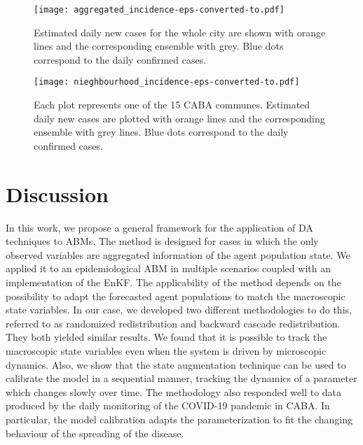 \documentclass[11pt,a4paper]{article}
\begin{document}
\begin{figure}
    \captionsetup{width=0.5\textwidth}
    \centering
    \texttt{[image: aggregated\_incidence-eps-converted-to.pdf]}
    \caption{Estimated daily new cases for the whole city are shown with orange lines and the corresponding ensemble with grey. Blue dots correspond to the daily confirmed cases.}
    \label{fig:aggregated_incidence}
\end{figure}

\begin{figure}
    \captionsetup{width=0.5\textwidth}
    \centering
    \texttt{[image: nieghbourhood\_incidence-eps-converted-to.pdf]}
    \caption{Each plot represents one of the 15 CABA communes. Estimated daily new cases are plotted with orange lines and the corresponding ensemble with grey lines. Blue dots correspond to the daily confirmed cases.}
    \label{fig:neighbourhood_incidence}
\end{figure}

\section{Discussion}

In this work, we propose a general framework for the application of DA techniques to ABMs. The method is designed for cases in which the only observed variables are aggregated information of the agent population state. We applied it to an epidemiological ABM in multiple scenarios coupled with an implementation of the EnKF. The applicability of the method depends on the possibility to adapt the forecasted agent populations to match the macroscopic state variables. In our case, we developed two different methodologies to do this, referred to as randomized redistribution and backward cascade redistribution. They both yielded similar results. We found that it is possible to track the macroscopic state variables even when the system is driven by microscopic dynamics. Also, we show that the state augmentation technique can be used to calibrate the model in a sequential manner, tracking the dynamics of a parameter which changes slowly over time. The methodology also responded well to data produced by the daily monitoring of the COVID-19 pandemic in CABA. In particular, the model calibration adapts the parameterization to fit the changing behaviour of the spreading of the disease.
\end{document}
